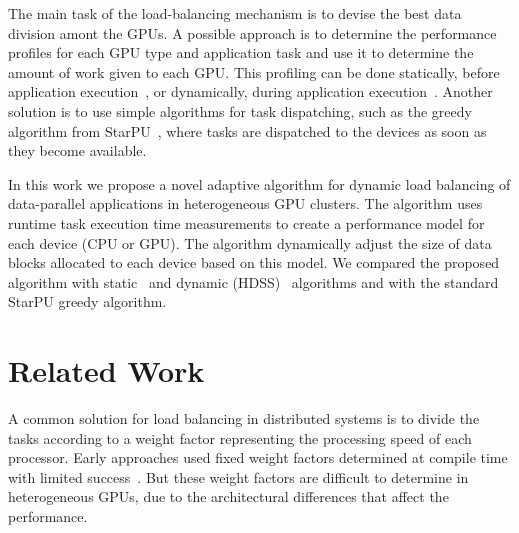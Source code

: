 \documentclass[journal]{IEEEtran}
\begin{document}
The main task of the load-balancing mechanism is to devise the best data
division amont the GPUs. A possible approach is to determine the performance
profiles for each GPU type and application task and use it to determine the
amount of work given to each GPU. This profiling can be done statically, before
application execution~\cite{raphael}, or dynamically, during application
execution~\cite{acosta, HDSS}. Another solution is to use simple algorithms for
task dispatching, such as the greedy algorithm from StarPU~\cite{starpu}, where
tasks are dispatched to the devices as soon as they become available.

In this work we propose a novel adaptive algorithm for dynamic load balancing of
data-parallel applications in heterogeneous GPU clusters. The algorithm uses
runtime task execution time measurements to create a performance model for each
device (CPU or GPU). The algorithm dynamically adjust the size of data blocks
allocated to each device based on this model. We compared the proposed algorithm
with static~\cite{raphael} and dynamic (HDSS)~\cite{HDSS} algorithms and with
the standard StarPU greedy algorithm.

% 
% 
% 
% 


\section{Related Work}

A common solution for load balancing in distributed systems is to divide the tasks
according to a weight factor representing the processing speed of each
processor. Early approaches used fixed weight factors determined at compile time
with limited success~\cite{Hummel}. But these weight factors are difficult to
determine in heterogeneous GPUs, due to the architectural differences that affect
the performance.
\end{document}

